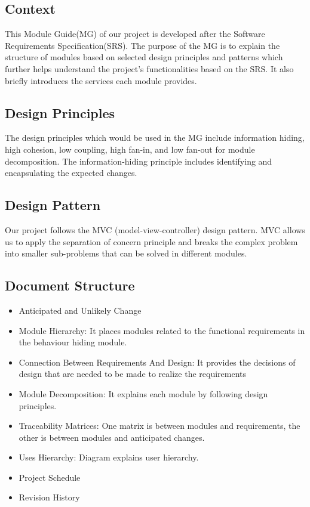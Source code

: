 \documentclass[12pt, titlepage]{article}
\begin{document}
	\subsection{Context}
	This Module Guide(MG) of our project is developed after the Software Requirements Specification(SRS). The purpose of the MG is to explain the structure of modules based on selected design principles and patterns which further helps understand the project's functionalities based on the SRS. It also briefly introduces the services each module provides.
	
	\subsection{Design Principles}
	The design principles which would be used in the MG include information hiding, high cohesion, low coupling, high fan-in, and low fan-out for module decomposition. The information-hiding principle includes identifying and encapsulating the expected changes. 

    \subsection{Design Pattern}
    Our project follows the MVC (model-view-controller) design pattern. MVC allows us to apply the separation of concern principle and breaks the complex problem into smaller sub-problems that can be solved in different modules. 

	\subsection{Document Structure}
\begin{itemize}

\item Anticipated and Unlikely Change

\item Module Hierarchy: It places modules related to the functional requirements in the behaviour hiding module.

\item Connection Between Requirements And Design: It provides the decisions of design that are needed to be made to realize the requirements 

\item Module Decomposition: It explains each module by following design principles.

\item Traceability Matrices: One matrix is between modules and requirements, the other is between modules and anticipated changes.

\item Uses Hierarchy: Diagram explains user hierarchy.

\item Project Schedule

\item Revision History
\end{itemize}	
\end{document}
